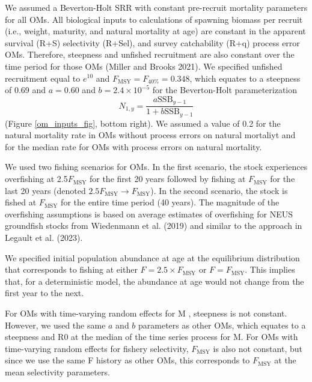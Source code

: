 \documentclass[
  12pt,
]{article}
\newcommand{\Fmsy}{\ensuremath{F_{\text{MSY}}}\xspace}
\providecommand{\DIFadd}[1]{{\protect\color{blue}\uwave{#1}}} %
\providecommand{\DIFaddbegin}{} %
\providecommand{\DIFaddend}{} %
\providecommand{\DIFdelbegin}{} %
\providecommand{\DIFdelend}{} %
\newcommand{\DIFscaledelfig}{0.5}
\newlength{\DIFdelgraphicswidth} %
\newlength{\DIFdelgraphicsheight} %
\newcommand{\DIFaddincludegraphics}[2][]{{\color{blue}\fbox{\DIFOincludegraphics[#1]{#2}}}} %
\newcommand{\DIFdelincludegraphics}[2][]{%
\sbox{\DIFdelgraphicsbox}{\DIFOincludegraphics[#1]{#2}}%
\settoboxwidth{\DIFdelgraphicswidth}{\DIFdelgraphicsbox} %
\settoboxtotalheight{\DIFdelgraphicsheight}{\DIFdelgraphicsbox} %
\scalebox{\DIFscaledelfig}{%
\parbox[b]{\DIFdelgraphicswidth}{\usebox{\DIFdelgraphicsbox}\\[-\baselineskip] \rule{\DIFdelgraphicswidth}{0em}}\llap{\resizebox{\DIFdelgraphicswidth}{\DIFdelgraphicsheight}{%
\setlength{\unitlength}{\DIFdelgraphicswidth}%
\begin{picture}(1,1)%
\thicklines\linethickness{2pt} %
{\color[rgb]{1,0,0}\put(0,0){\framebox(1,1){}}}%
{\color[rgb]{1,0,0}\put(0,0){\line( 1,1){1}}}%
{\color[rgb]{1,0,0}\put(0,1){\line(1,-1){1}}}%
\end{picture}%
}\hspace*{3pt}}} %
} %
\DeclareRobustCommand{\DIFaddbegin}{\DIFOaddbegin \let\includegraphics\DIFaddincludegraphics} %
\DeclareRobustCommand{\DIFaddend}{\DIFOaddend \let\includegraphics\DIFOincludegraphics} %
\DeclareRobustCommand{\DIFdelbegin}{\DIFOdelbegin \let\includegraphics\DIFdelincludegraphics} %
\DeclareRobustCommand{\DIFdelend}{\DIFOaddend \let\includegraphics\DIFOincludegraphics} %
\begin{document}
We assumed a Beverton-Holt SRR with constant pre-recruit mortality
parameters for all OMs. All biological inputs to calculations of
spawning biomass per recruit (i.e., weight, maturity, and natural
mortality at age) are constant in the apparent survival (R+S)
selectivity (R+Sel), and survey catchability (R+q) process error OMs.
Therefore, steepness and unfished recruitment are also constant over the
time period for those OMs (Miller and Brooks 2021). We specified
unfished recruitment equal to \(e^{10}\) and
\(\Fmsy = F_{40\%} = 0.348\), which equates to a steepness of 0.69 and
\(a=0.60\) and \(b = 2.4 \times 10^{-5}\) for the Beverton-Holt
parameterization \[
N_{1,y} = \frac{a \text{SSB}_{y-1}}{1 + b \text{SSB}_{y-1}} 
\] (Figure \ref{om_inputs_fig}, bottom right). We assumed a value of 0.2
for the natural mortality rate in OMs without process errors on natural
mortaliyt and for the median rate for OMs with process errors on natural
mortality.

We used two fishing scenarios for OMs. In the first scenario, the stock
experiences overfishing at 2.5\Fmsy for the first 20 years followed by
fishing at \Fmsy for the last 20 years (denoted
\(2.5\Fmsy \rightarrow \Fmsy\)). In the second scenario, the stock is
fished at \Fmsy for the entire time period (40 years). The magnitude of
the overfishing assumptions is based on average estimates of overfishing
for NEUS groundfish stocks from Wiedenmann et al. (2019) and similar to
the approach in Legault et al. (2023).

We specified initial population abundance at age at the equilibrium
distribution that corresponds to fishing at either
\(F = 2.5\times \Fmsy\) or \(F = \Fmsy\). This implies that, for a
deterministic model, the abundance at age would not change from the
first year to the next.

For OMs with time-varying random effects for M , steepness is not
constant. However, we used the same \(a\) and \(b\) parameters as other
OMs, which equates to a steepness and R0 at the median of the time
series process for M. For OMs with time-varying random effects for
fishery selectivity, \Fmsy is also not constant, but since we use the
same F history as other OMs, this corresponds to \Fmsy at the mean
selectivity parameters.

\DIFdelbegin %
\DIFdelend \DIFaddbegin \subsubsection*{\DIFadd{Fleets}}\label{fleets}
\DIFaddend {}
\end{document}
